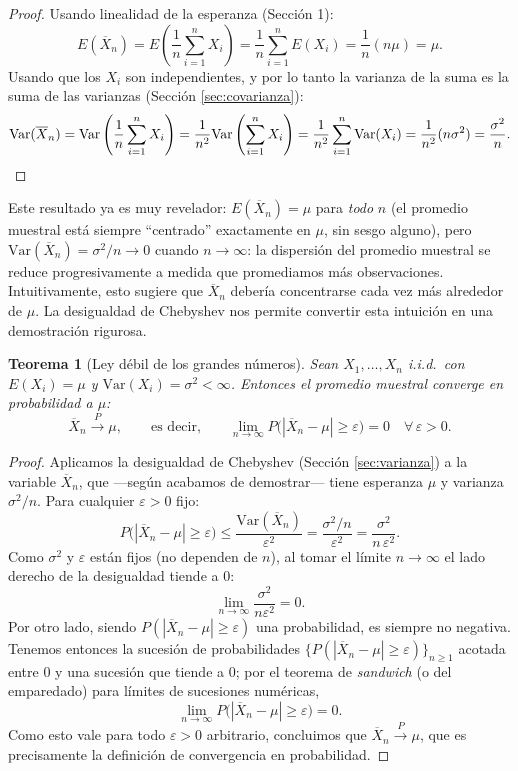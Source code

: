 \documentclass[11pt,a4paper]{article}
\theoremstyle{plain}
\newtheorem{teorema}{Teorema}[section]
\theoremstyle{definition}
\theoremstyle{remark}
\begin{document}
\begin{proof}
Usando linealidad de la esperanza (Sección 1):
\[
E(\overline{X}_n) = E\left(\frac1n\sum_{i=1}^n X_i\right) = \frac1n\sum_{i=1}^n E(X_i) = \frac1n(n\mu) = \mu.
\]
Usando que los $X_i$ son independientes, y por lo tanto la varianza de la suma es la suma de las varianzas (Sección \ref{sec:covarianza}):
\[
\text{Var}(\overline{X}_n) = \text{Var}\left(\frac1n\sum_{i=1}^n X_i\right) = \frac{1}{n^2}\text{Var}\left(\sum_{i=1}^n X_i\right) = \frac{1}{n^2}\sum_{i=1}^n \text{Var}(X_i) = \frac{1}{n^2}(n\sigma^2) = \frac{\sigma^2}{n}. \qedhere
\]
\end{proof}

Este resultado ya es muy revelador: $E(\overline{X}_n)=\mu$ para \emph{todo} $n$ (el promedio muestral está siempre ``centrado'' exactamente en $\mu$, sin sesgo alguno), pero $\text{Var}(\overline{X}_n)=\sigma^2/n \to 0$ cuando $n\to\infty$: la dispersión del promedio muestral se reduce progresivamente a medida que promediamos más observaciones. Intuitivamente, esto sugiere que $\overline{X}_n$ debería concentrarse cada vez más alrededor de $\mu$. La desigualdad de Chebyshev nos permite convertir esta intuición en una demostración rigurosa.

\begin{teorema}[Ley débil de los grandes números]
Sean $X_1,\dots,X_n$ i.i.d.\ con $E(X_i)=\mu$ y $\text{Var}(X_i)=\sigma^2<\infty$. Entonces el promedio muestral converge en probabilidad a $\mu$:
\[
\overline{X}_n \xrightarrow{P} \mu, \qquad\text{es decir,}\qquad \lim_{n\to\infty} P\big(|\overline{X}_n-\mu|\geq\varepsilon\big) = 0 \quad\forall\,\varepsilon>0.
\]
\end{teorema}

\begin{proof}
Aplicamos la desigualdad de Chebyshev (Sección \ref{sec:varianza}) a la variable $\overline{X}_n$, que —según acabamos de demostrar— tiene esperanza $\mu$ y varianza $\sigma^2/n$. Para cualquier $\varepsilon>0$ fijo:
\[
P\big(|\overline{X}_n-\mu|\geq\varepsilon\big) \leq \frac{\text{Var}(\overline{X}_n)}{\varepsilon^2} = \frac{\sigma^2/n}{\varepsilon^2} = \frac{\sigma^2}{n\,\varepsilon^2}.
\]
Como $\sigma^2$ y $\varepsilon$ están fijos (no dependen de $n$), al tomar el límite $n\to\infty$ el lado derecho de la desigualdad tiende a $0$:
\[
\lim_{n\to\infty} \frac{\sigma^2}{n\varepsilon^2} = 0.
\]
Por otro lado, siendo $P(|\overline{X}_n-\mu|\geq\varepsilon)$ una probabilidad, es siempre no negativa. Tenemos entonces la sucesión de probabilidades $\{P(|\overline{X}_n-\mu|\geq\varepsilon)\}_{n\geq1}$ acotada entre $0$ y una sucesión que tiende a $0$; por el teorema de \emph{sandwich} (o del emparedado) para límites de sucesiones numéricas,
\[
\lim_{n\to\infty} P\big(|\overline{X}_n-\mu|\geq\varepsilon\big) = 0.
\]
Como esto vale para todo $\varepsilon>0$ arbitrario, concluimos que $\overline{X}_n \xrightarrow{P} \mu$, que es precisamente la definición de convergencia en probabilidad.
\end{proof}
\end{document}

